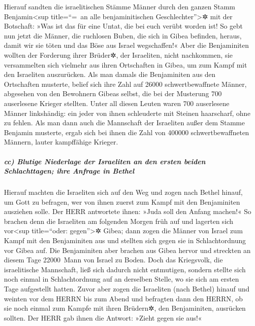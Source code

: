 Hierauf sandten die israelitischen Stämme Männer durch
den ganzen Stamm Benjamin\textless sup title=``=~an alle
benjaminitischen Geschlechter''\textgreater✲ mit der Botschaft: »Was ist
das für eine Untat, die bei euch verübt worden ist! So
gebt nun jetzt die Männer, die ruchlosen Buben, die sich in Gibea
befinden, heraus, damit wir sie töten und das Böse aus Israel
wegschaffen!« Aber die Benjaminiten wollten der Forderung ihrer Brüder✲,
der Israeliten, nicht nachkommen, sie versammelten sich
vielmehr aus ihren Ortschaften in Gibea, um zum Kampf mit den Israeliten
auszurücken. Als man damals die Benjaminiten aus den
Ortschaften musterte, belief sich ihre Zahl auf 26000 schwertbewaffnete
Männer, abgesehen von den Bewohnern Gibeas selbst, die bei der Musterung
700 auserlesene Krieger stellten. Unter all diesen Leuten
waren 700 auserlesene Männer linkshändig: ein jeder von ihnen
schleuderte mit Steinen haarscharf, ohne zu fehlen. Als
man dann auch die Mannschaft der Israeliten außer dem Stamme Benjamin
musterte, ergab sich bei ihnen die Zahl von 400000 schwertbewaffneten
Männern, lauter kampffähige Krieger.

\hypertarget{cc-blutige-niederlage-der-israeliten-an-den-ersten-beiden-schlachttagen-ihre-anfrage-in-bethel}{%
\subparagraph{cc) Blutige Niederlage der Israeliten an den ersten beiden
Schlachttagen; ihre Anfrage in
Bethel}\label{cc-blutige-niederlage-der-israeliten-an-den-ersten-beiden-schlachttagen-ihre-anfrage-in-bethel}}

Hierauf machten die Israeliten sich auf den Weg und zogen
nach Bethel hinauf, um Gott zu befragen, wer von ihnen zuerst zum Kampf
mit den Benjaminiten ausziehen solle. Der HERR antwortete ihnen: »Juda
soll den Anfang machen!« So brachen denn die Israeliten
am folgenden Morgen früh auf und lagerten sich vor\textless sup
title=``oder: gegen''\textgreater✲ Gibea; dann zogen die
Männer von Israel zum Kampf mit den Benjaminiten aus und stellten sich
gegen sie in Schlachtordnung vor Gibea auf. Die
Benjaminiten aber brachen aus Gibea hervor und streckten an diesem Tage
22000~Mann von Israel zu Boden. Doch das Kriegsvolk, die
israelitische Mannschaft, ließ sich dadurch nicht entmutigen, sondern
stellte sich noch einmal in Schlachtordnung auf an derselben Stelle, wo
sie sich am ersten Tage aufgestellt hatten. Zuvor aber
zogen die Israeliten (nach Bethel) hinauf und weinten vor dem HERRN bis
zum Abend und befragten dann den HERRN, ob sie noch einmal zum Kampfe
mit ihren Brüdern✲, den Benjaminiten, ausrücken sollten. Der HERR gab
ihnen die Antwort: »Zieht gegen sie aus!«


